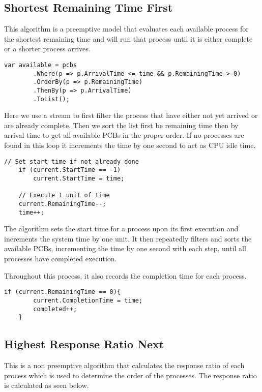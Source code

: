\documentclass[conference]{report}
\begin{document}
\subsection*{Shortest Remaining Time First}
This algorithm is a preemptive model that evaluates each available process for the shortest remaining time and will run that process until it is either complete or a shorter process arrives.

\hfill
\begin{lstlisting}[caption={SRTF Finding Available Processes}, label=code:srtf-1]
    var available = pcbs
        .Where(p => p.ArrivalTime <= time && p.RemainingTime > 0)
        .OrderBy(p => p.RemainingTime)
        .ThenBy(p => p.ArrivalTime)
        .ToList();
\end{lstlisting}

Here we use a stream to first filter the process that have either not yet arrived or are already complete. Then we sort the list first be remaining time then by arrival time to get all available PCBs in the proper order. If no processes are found in this loop it increments the time by one second to act as CPU idle time.

\hfill
\begin{lstlisting}[caption={SRTF Increment Time}, label=code:srtf-2]
    // Set start time if not already done
    if (current.StartTime == -1)
        current.StartTime = time;

    // Execute 1 unit of time
    current.RemainingTime--;
    time++;
\end{lstlisting}

The algorithm sets the start time for a process upon its first execution and increments the system time by one unit. It then repeatedly filters and sorts the available PCBs, incrementing the time by one second with each step, until all processes have completed execution.

Throughout this process, it also records the completion time for each process.

\hfill
\begin{lstlisting}[caption={SRTF Set Completed time}, label=code:srtf-3]
    if (current.RemainingTime == 0){
        current.CompletionTime = time;
        completed++;
    }
\end{lstlisting}

\subsection*{Highest Response Ratio Next}
This is a non preemptive algorithm that calculates the response ratio of each process which is used to determine the order of the processes. The response ratio is calculated as seen below.
\end{document}
